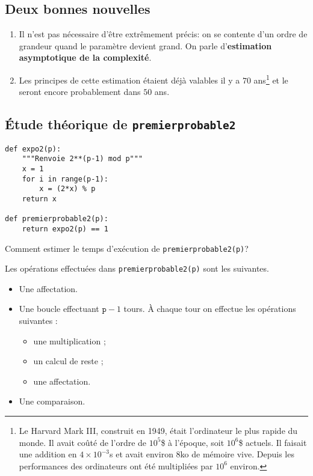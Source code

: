 \subsection{Deux bonnes nouvelles}

\begin{enumerate}
\item Il n'est pas nécessaire d'être extrêmement précis: on se
  contente d'un ordre de grandeur quand le paramètre devient grand. On
  parle d'\textbf{estimation asymptotique de la complexité}.
\item Les principes de cette estimation étaient déjà
  valables il y a $70$ ans\footnote{Le Harvard Mark III, construit en
    1949, était  l'ordinateur le plus rapide du
    monde. Il avait coûté de l'ordre de $10^{5}$\$ à l'époque, soit
    $10^{6}$\$ actuels. Il faisait une addition en $4\times 10^{-3}$s
    et avait environ $8$ko de mémoire vive. Depuis les performances
    des ordinateurs ont été multipliées par $10^{6}$ environ.} et le
  seront encore probablement dans $50$ ans.
\end{enumerate}

\subsection{Étude théorique de \texttt{premierprobable2}}

\begin{lstlisting}
def expo2(p):
    """Renvoie 2**(p-1) mod p"""
    x = 1
    for i in range(p-1):
        x = (2*x) % p
    return x  
    
def premierprobable2(p):
    return expo2(p) == 1
\end{lstlisting}

Comment estimer le temps d'exécution de \texttt{premierprobable2(p)}?

Les opérations effectuées dans \texttt{premierprobable2(p)} sont les suivantes.
\begin{itemize}
\item[\textbullet] Une affectation.
\item[\textbullet] Une boucle effectuant $\texttt{p}-1$ tours. À chaque tour on
  effectue les opérations suivantes :
  \begin{itemize}
  \item une multiplication ;
  \item un calcul de reste ;
  \item une affectation.
  \end{itemize}
\item[\textbullet] Une comparaison.
\end{itemize}

